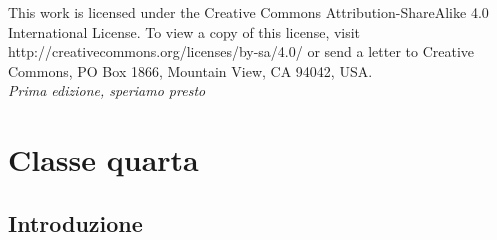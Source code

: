 \documentclass[11pt,fleqn,a5paper]{book} %
\begin{document}
    \noindent This work is licensed under the Creative Commons Attribution-ShareAlike 4.0 International License. To view a copy of this license, visit http://creativecommons.org/licenses/by-sa/4.0/ or send a letter to Creative Commons, PO Box 1866, Mountain View, CA 94042, USA.\\
    
    \noindent \textit{Prima edizione, speriamo presto} %
    
    
    
    
    \pagestyle{empty} %
    
    \tableofcontents %
    
    \cleardoublepage %
    
    \pagestyle{fancy} %
    
    
    \part{Classe quarta}
    \label{part: Classe quarta}
    
    
    
    \chapter{Introduzione}
    \label{cap: Introduzione}
        
\end{document}
